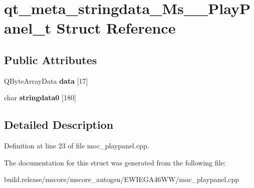 \hypertarget{structqt__meta__stringdata___ms_____play_panel__t}{}\section{qt\+\_\+meta\+\_\+stringdata\+\_\+\+Ms\+\_\+\+\_\+\+Play\+Panel\+\_\+t Struct Reference}
\label{structqt__meta__stringdata___ms_____play_panel__t}
\subsection*{Public Attributes}
\begin{DoxyCompactItemize}
\item 
\mbox{\label{structqt__meta__stringdata___ms_____play_panel__t_a3bcecae38913ef7ceae5ee3540132b04}} 
Q\+Byte\+Array\+Data {\bfseries data} \mbox{[}17\mbox{]}
\item 
\mbox{\label{structqt__meta__stringdata___ms_____play_panel__t_a31500878a129ededad2bf58daa797ed0}} 
char {\bfseries stringdata0} \mbox{[}180\mbox{]}
\end{DoxyCompactItemize}


\subsection{Detailed Description}


Definition at line 23 of file moc\+\_\+playpanel.\+cpp.



The documentation for this struct was generated from the following file\+:\begin{DoxyCompactItemize}
\item 
build.\+release/mscore/mscore\+\_\+autogen/\+E\+W\+I\+E\+G\+A46\+W\+W/moc\+\_\+playpanel.\+cpp\end{DoxyCompactItemize}

